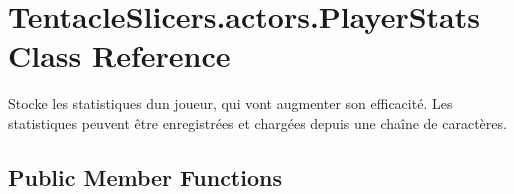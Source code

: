 \hypertarget{class_tentacle_slicers_1_1actors_1_1_player_stats}{}\section{Tentacle\+Slicers.\+actors.\+Player\+Stats Class Reference}
\label{class_tentacle_slicers_1_1actors_1_1_player_stats}


Stocke les statistiques d\textquotesingle{}un joueur, qui vont augmenter son efficacité. Les statistiques peuvent être enregistrées et chargées depuis une chaîne de caractères.  


\subsection*{Public Member Functions}
